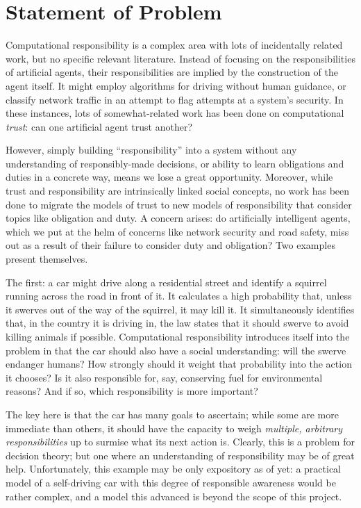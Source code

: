 \chapter{Statement of Problem}\label{sec:statement_of_problem}

Computational responsibility is a complex area with lots of incidentally related work, but no specific relevant literature. Instead of focusing on the responsibilities of artificial agents, their responsibilities are implied by the construction of the agent itself. It might employ algorithms for driving without human guidance, or classify network traffic in an attempt to flag attempts at a system's security. In these instances, lots of somewhat-related work has been done on computational \emph{trust}: can one artificial agent trust another?\par

However, simply building ``responsibility'' into a system without any understanding of responsibly-made decisions, or ability to learn obligations and duties in a concrete way, means we lose a great opportunity. Moreover, while trust and responsibility are intrinsically linked social concepts, no work has been done to migrate the models of trust to new models of responsibility that consider topics like obligation and duty. A concern arises: do artificially intelligent agents, which we put at the helm of concerns like network security and road safety, miss out as a result of their failure to consider duty and obligation? Two examples present themselves.\par

The first: a car might drive along a residential street and identify a squirrel running across the road in front of it. It calculates a high probability that, unless it swerves out of the way of the squirrel, it may kill it. It simultaneously identifies that, in the country it is driving in, the law states that it should swerve to avoid killing animals if possible. Computational responsibility introduces itself into the problem in that the car should also have a social understanding: will the swerve endanger humans? How strongly should it weight that probability into the action it chooses? Is it also responsible for, say, conserving fuel for environmental reasons? And if so, which responsibility is more important? \par

The key here is that the car has many goals to ascertain; while some are more immediate than others, it should have the capacity to weigh \emph{multiple, arbitrary responsibilities} up to surmise what its next action is. Clearly, this is a problem for decision theory; but one where an understanding of responsibility may be of great help. Unfortunately, this example may be only expository as of yet: a practical model of a self-driving car with this degree of responsible awareness would be rather complex, and a model this advanced is beyond the scope of this project.\par

